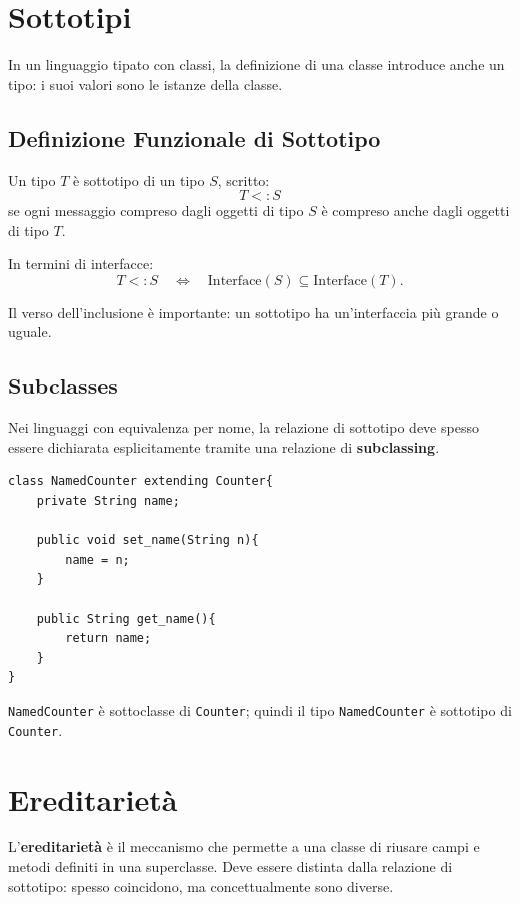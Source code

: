 \documentclass{article}
\begin{document}
\section{Sottotipi}

In un linguaggio tipato con classi, la definizione di una classe introduce anche un tipo: i suoi valori sono le istanze della classe.

\subsection{Definizione Funzionale di Sottotipo}

Un tipo $T$ è sottotipo di un tipo $S$, scritto:
\[
T <: S
\]
se ogni messaggio compreso dagli oggetti di tipo $S$ è compreso anche dagli oggetti di tipo $T$.

In termini di interfacce:
\[
T <: S \quad \Longleftrightarrow \quad \mathrm{Interface}(S) \subseteq \mathrm{Interface}(T).
\]

Il verso dell'inclusione è importante: un sottotipo ha un'interfaccia più grande o uguale.

\subsection{Subclasses}

Nei linguaggi con equivalenza per nome, la relazione di sottotipo deve spesso essere dichiarata esplicitamente tramite una relazione di \textbf{subclassing}.

\begin{lstlisting}
class NamedCounter extending Counter{
    private String name;

    public void set_name(String n){
        name = n;
    }

    public String get_name(){
        return name;
    }
}
\end{lstlisting}

\texttt{NamedCounter} è sottoclasse di \texttt{Counter}; quindi il tipo \texttt{NamedCounter} è sottotipo di \texttt{Counter}.

\section{Ereditarietà}

L'\textbf{ereditarietà} è il meccanismo che permette a una classe di riusare campi e metodi definiti in una superclasse. Deve essere distinta dalla relazione di sottotipo: spesso coincidono, ma concettualmente sono diverse.
\end{document}
